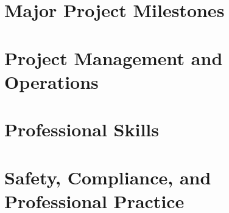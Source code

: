 \documentclass[11pt,letterpaper,twoside,openany]{book}
\begin{document}







\part{Major Project Milestones}






\part{Project Management and Operations}








\part{Professional Skills}






\part{Safety, Compliance, and Professional Practice}




\backmatter

\appendix






\end{document}
